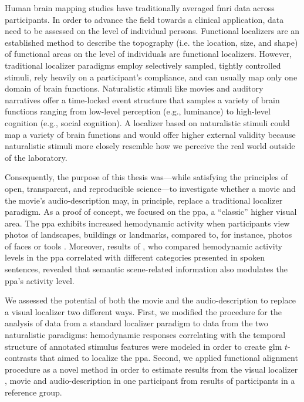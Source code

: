 

Human brain mapping studies have traditionally averaged \ac{fmri} data across
participants.
%
In order to advance the field towards a clinical application, data need to be
assessed on the level of individual persons.
Functional localizers are an established method to describe the topography (i.e.
the location, size, and shape) of functional areas on the level of individuals
are functional localizers.
However, traditional localizer paradigms employ selectively sampled, tightly
controlled stimuli, rely heavily on a participant's compliance, and can usually
map only one domain of brain functions.
Naturalistic stimuli like movies and auditory narratives \citep[cf.][for
reviews]{jaaskelainen2021movies, jaaskelainen2020neural} offer a time-locked
event structure that samples a variety of brain functions ranging from low-level
perception (e.g., luminance) to high-level cognition (e.g., social cognition).
%
A localizer based on naturalistic stimuli could map a variety of brain functions
and would offer higher external validity because naturalistic stimuli more
closely resemble how we perceive the real world outside of the laboratory.

Consequently, the purpose of this thesis was---while satisfying the principles
of open, transparent, and reproducible science---to investigate whether a movie
and the movie's audio-description may, in principle, replace a traditional
localizer paradigm.
As a proof of concept, we focused on the \ac{ppa}, a ``classic'' higher visual
area.
%
The \ac{ppa} exhibits increased hemodynamic activity when participants view
photos of landscapes, buildings or landmarks, compared to, for instance, photos
of faces or tools \citep[e.g.,][for reviews]{epstein2014neural,
aminoff2013role}.
%
Moreover, results of \citet{aziz2008modulation}, who compared hemodynamic
activity levels in the \ac{ppa} correlated with different categories presented
in spoken sentences, revealed that semantic scene-related information also
modulates the \ac{ppa}'s activity level.

%
We assessed the potential of both the movie and the audio-description to replace
a visual localizer two different ways.
First, we modified the procedure for the analysis of data from a standard
localizer paradigm to data from the two naturalistic paradigms:
%
hemodynamic responses correlating with the temporal structure of annotated
stimulus features \citep[cf.][]{haeusler2016cutanno, haeusler2021speechanno}
were modeled in order to create \ac{glm} $t$-contrasts that aimed to localize
the \ac{ppa}.
Second, we applied functional alignment procedure as a novel method in order to
estimate results from the visual localizer \citep[cf.][]{sengupta2016extension},
movie and audio-description \citep[cf.][]{haeusler2022processing} in one
participant from results of participants in a reference group.


